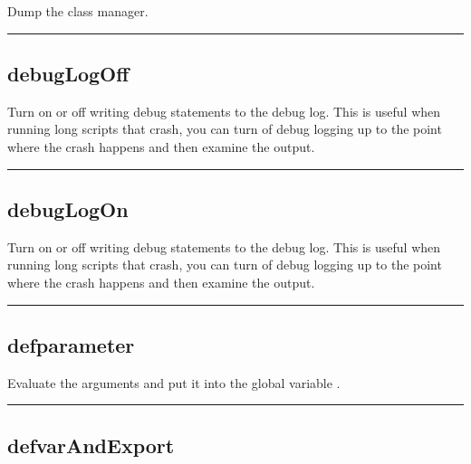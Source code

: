 \begin{itemize}
  Dump the class manager.

\rule{6in}{0.01cm}\par
{}\par
\subsection{debugLogOff}

  Turn on or off writing debug statements to the debug log. This is useful when running
  long scripts that crash, you can turn of debug logging up to the point where
  the crash happens and then examine the output.

\rule{6in}{0.01cm}\par
{}\par
\subsection{debugLogOn}

  Turn on or off writing debug statements to the debug log. This is useful when running
  long scripts that crash, you can turn of debug logging up to the point where
  the crash happens and then examine the output.

\rule{6in}{0.01cm}\par
{}\par
\subsection{defparameter}
  \par

  Evaluate the arguments and put it into the global variable .

\rule{6in}{0.01cm}\par
{}\par
\subsection{defvarAndExport}
  \par


\end{itemize}
